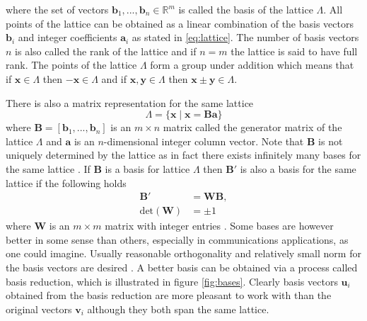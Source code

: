 \documentclass[english,12pt,a4paper,pdftex,sci,utf8]{aaltothesis}
\begin{document}
\noindent where the set of vectors $\mathbf{b}_1, ... , \mathbf{b}_n \in \mathbb{R}^m$ is called the basis of the lattice $\Lambda$. All points of the lattice can be obtained as a linear combination of the basis vectors $\mathbf{b}_i$ and integer coefficients $\mathbf{a}_i$ as stated in \eqref{eq:lattice}. The number of basis vectors $n$ is also called the rank of the lattice and if $n = m$ the lattice is said to have full rank. The points of the lattice $\Lambda$ form a group under addition which means that if $\mathbf{x} \in \Lambda$ then $-\mathbf{x} \in \Lambda$ and if $\mathbf{x}, \mathbf{y} \in \Lambda$ then $\mathbf{x} \pm \mathbf{y} \in \Lambda$. \cite{cassels}
\par There is also a matrix representation for the same lattice
\begin{equation}
\Lambda = \{\mathbf{x}\mid\mathbf{x} = \mathbf{B}\mathbf{a} \} \label{eq:matrix}
\end{equation}
where $\mathbf{B} = [\mathbf{b}_1, ... , \mathbf{b}_n]$ is an $m \times n$ matrix called the generator matrix of the lattice $\Lambda$ and $\mathbf{a}$ is an $n$-dimensional integer column vector. Note that $\mathbf{B}$ is not uniquely determined by the lattice as in fact there exists infinitely many bases for the same lattice \cite{cassels}. If $\mathbf{B}$ is a basis for lattice $\Lambda$ then $\mathbf{B}'$ is also a basis for the same lattice if the following holds
\begin{align}
\mathbf{B}' &= \mathbf{W}\mathbf{B}, \\
\text{det}(\mathbf{W}) &= \pm 1
\label{eq:basis_change}
\end{align}
where $\mathbf{W}$ is an $m \times m$ matrix with integer entries \cite{agrell}. Some bases are however better in some sense than others, especially in communications applications, as one could imagine. Usually reasonable orthogonality and relatively small norm for the basis vectors are desired \cite{agrell}. A better basis can be obtained via a process called basis reduction, which is illustrated in figure \ref{fig:bases}. Clearly basis vectors $\mathbf{u}_i$ obtained from the basis reduction are more pleasant to work with than the original vectors $\mathbf{v}_i$ although they both span the same lattice.
\end{document}
